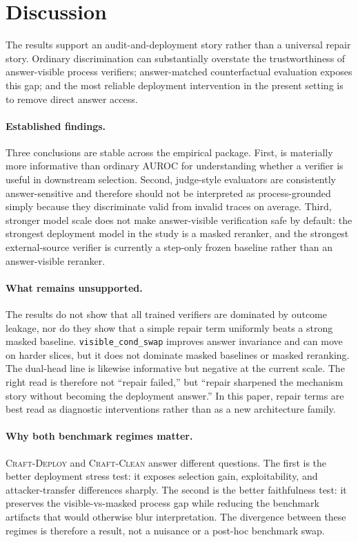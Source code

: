 \section{Discussion}

The results support an audit-and-deployment story rather than a universal
repair story. Ordinary discrimination can substantially overstate the
trustworthiness of answer-visible process verifiers; answer-matched
counterfactual evaluation exposes this gap; and the most reliable deployment
intervention in the present setting is to remove direct answer access.

\paragraph{Established findings.}
Three conclusions are stable across the empirical package. First,
\amcd{} is materially more informative than ordinary AUROC for understanding
whether a verifier is useful in downstream selection. Second, judge-style
evaluators are consistently answer-sensitive and therefore should not be
interpreted as process-grounded simply because they discriminate valid from
invalid traces on average. Third, stronger model scale does not make
answer-visible verification safe by default: the strongest deployment model in
the study is a masked reranker, and the strongest external-source verifier is
currently a step-only frozen baseline rather than an answer-visible reranker.

\paragraph{What remains unsupported.}
The results do not show that all trained verifiers are dominated by outcome
leakage, nor do they show that a simple repair term uniformly beats a strong
masked baseline. \texttt{visible\_cond\_swap} improves answer invariance and
can move \amcd{} on harder slices, but it does not dominate masked baselines or
masked reranking. The dual-head line is likewise informative but negative at
the current scale. The right read is therefore not ``repair failed,'' but
``repair sharpened the mechanism story without becoming the deployment answer.''
In this paper, repair terms are best read as diagnostic interventions rather
than as a new architecture family.

\paragraph{Why both benchmark regimes matter.}
\textsc{Craft-Deploy} and \textsc{Craft-Clean} answer different questions. The
first is the better deployment stress test: it exposes selection gain,
exploitability, and attacker-transfer differences sharply. The second is the
better faithfulness test: it preserves the visible-vs-masked process gap while
reducing the benchmark artifacts that would otherwise blur interpretation. The
divergence between these regimes is therefore a result, not a nuisance or a
post-hoc benchmark swap.

